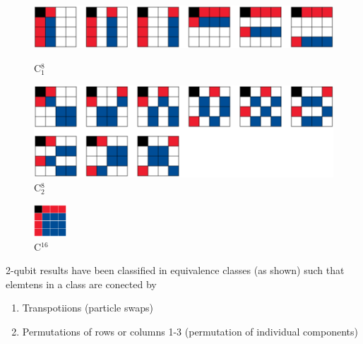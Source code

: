 \documentclass[11pt,dvipsnames]{article} %
\begin{document}
\begin{figure}[H]
	\begin{minipage}[c]{0.5\textwidth}
		\centering
	  \includegraphics[width=.9\textwidth]
		{img/C18.png}
		\vspace{1.2cm}
		\caption{C${}_1^8$}
	\end{minipage}\hfill
	\begin{minipage}[c]{0.5\textwidth}
		\centering
	  \includegraphics[width=.9\textwidth]
		{img/C28.png}
		\caption{C${}_2^8$}
	\end{minipage}
\end{figure}

\begin{figure}[H]
	\centering
  \includegraphics[height=1.2cm]
	{img/C0.png}
	\caption{C${}^{16}$}
\end{figure}

2-qubit results have been classified in equivalence classes (as shown) such
that elemtens in a class are conected by
\begin{enumerate}
	\item Transpotiions (particle swaps)
	\item Permutations of rows or columns 1-3 (permutation of individual 
	components)
\end{enumerate}
\end{document}
